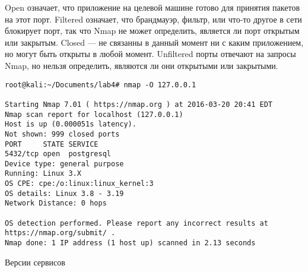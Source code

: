 \documentclass[12pt,a4paper]{report}
\begin{document}
Open означает, что приложение на целевой машине готово для принятия пакетов на этот порт. Filtered означает, что брандмауэр, фильтр, или что-то другое в сети блокирует порт, так что Nmap не может определить, является ли порт открытым или закрытым. Closed — не связанны в данный момент ни с каким приложением, но могут быть открыты в любой момент. Unfiltered порты отвечают на запросы Nmap, но нельзя определить, являются ли они открытыми или закрытыми. 

\begin{verbatim}
root@kali:~/Documents/lab4# nmap -O 127.0.0.1

Starting Nmap 7.01 ( https://nmap.org ) at 2016-03-20 20:41 EDT
Nmap scan report for localhost (127.0.0.1)
Host is up (0.000051s latency).
Not shown: 999 closed ports
PORT     STATE SERVICE
5432/tcp open  postgresql
Device type: general purpose
Running: Linux 3.X
OS CPE: cpe:/o:linux:linux_kernel:3
OS details: Linux 3.8 - 3.19
Network Distance: 0 hops

OS detection performed. Please report any incorrect results at https://nmap.org/submit/ .
Nmap done: 1 IP address (1 host up) scanned in 2.13 seconds
\end{verbatim}




Версии сервисов
\end{document}
